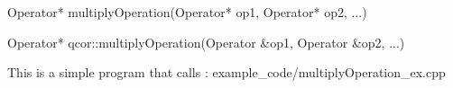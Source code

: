 
\begin{apidefinition}

\begin{Csynopsis}
    Operator* multiplyOperation(Operator* op1, Operator* op2, ...)
\end{Csynopsis}

\begin{Cppsynopsis}
    Operator* qcor::multiplyOperation(Operator &op1, Operator &op2, ...)
\end{Cppsynopsis}


\begin{apiarguments}
\end{apiarguments}



\apinotes{
    
}

\begin{apiexamples}

\apicppexample
    { This is a simple program that calls : } 
    { example_code/multiplyOperation_ex.cpp} 
    {}

\end{apiexamples}

\end{apidefinition}
